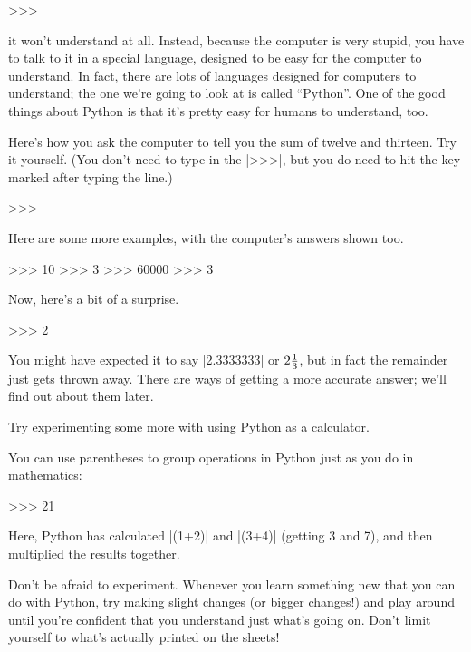 \documentclass[pdftex]{wsheet}
\begin{document}
\begin{interaction}
>>> 
\end{interaction}

it won't understand at all. Instead, because the computer is very
stupid, you have to talk to it in a special language, designed to
be easy for the computer to understand. In fact, there are lots
of languages designed for computers to understand; the one we're
going to look at is called ``Python''. One of the good things
about Python is that it's pretty easy for humans to understand,
too.

Here's how you ask the computer to tell you the sum of twelve and
thirteen. Try it yourself. (You don't need to type in the |>>>|,
but you do need to hit the key marked  after typing
the line.)

\begin{interaction}
>>> 
\end{interaction}

Here are some more examples, with the computer's
answers shown too.

\begin{interaction}
>>> 
10
>>>       
3                    
>>> 
60000
>>>          
3
\end{interaction}

Now, here's a bit of a surprise.

\begin{interaction}
>>> 
2
\end{interaction}

You might have expected it to say |2.3333333| or $2{1\over3}$,
but in fact the remainder just gets thrown away. There are ways of
getting a more accurate answer; we'll find out about them later.

Try experimenting some more with using Python as a calculator.

You can use parentheses to group operations in Python
just as you do in mathematics:

\begin{interaction}
>>> 
21
\end{interaction}

Here, Python has calculated |(1+2)| and |(3+4)| (getting 3 and 7),
and then multiplied the results together.

\begin{note}
Don't be afraid to experiment. Whenever you learn something new
that you can do with Python, try making slight changes (or
bigger changes!) and play around until you're confident that
you understand just what's going on. Don't limit yourself to
what's actually printed on the sheets!
\end{note}
\end{document}
